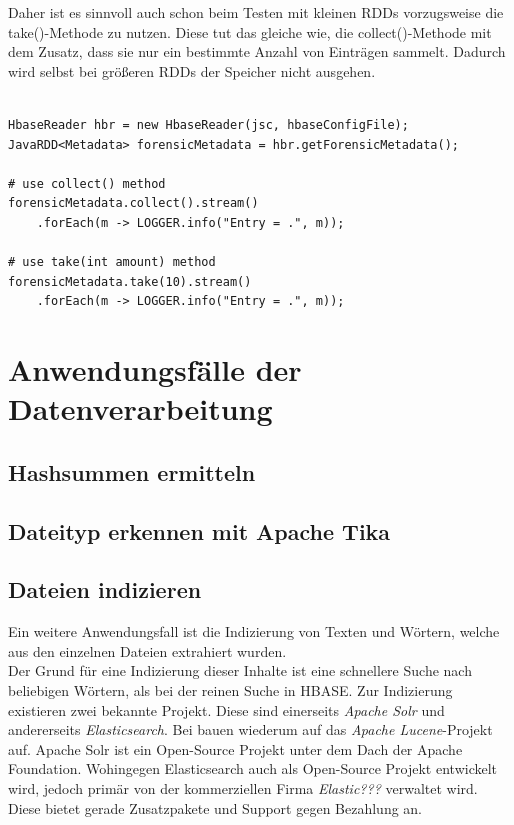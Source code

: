 \noindent
Daher ist es sinnvoll auch schon beim Testen mit kleinen RDDs vorzugsweise die take()-Methode zu nutzen. Diese tut das gleiche wie, die collect()-Methode mit dem Zusatz, dass sie nur ein bestimmte Anzahl von Einträgen sammelt. Dadurch wird selbst bei größeren RDDs der Speicher nicht ausgehen. 


\begin{lstlisting}[label={lst:spark_rdd_collect},caption= Spark Java RDD collect()-Methode ,captionpos=b,frame=single,style=customshell]

HbaseReader hbr = new HbaseReader(jsc, hbaseConfigFile);
JavaRDD<Metadata> forensicMetadata = hbr.getForensicMetadata();

# use collect() method
forensicMetadata.collect().stream()
	.forEach(m -> LOGGER.info("Entry = .", m));

# use take(int amount) method	
forensicMetadata.take(10).stream()
	.forEach(m -> LOGGER.info("Entry = .", m));	
\end{lstlisting}


\section{Anwendungsfälle der Datenverarbeitung}
\subsection{Hashsummen ermitteln}

\subsection{Dateityp erkennen mit Apache Tika}

\subsection{Dateien indizieren}
Ein weitere Anwendungsfall ist die Indizierung von Texten und Wörtern, welche aus den einzelnen Dateien extrahiert wurden.\\

\noindent
Der Grund für eine Indizierung dieser Inhalte ist eine schnellere Suche nach beliebigen Wörtern, als bei der reinen Suche in HBASE. Zur Indizierung existieren zwei bekannte Projekt. Diese sind einerseits \textit{Apache Solr} und andererseits \textit{Elasticsearch}. Bei bauen wiederum auf das \textit{Apache Lucene}-Projekt auf. Apache Solr ist ein Open-Source Projekt unter dem Dach der Apache Foundation. Wohingegen Elasticsearch auch als Open-Source Projekt entwickelt wird, jedoch primär von der kommerziellen Firma \textit{Elastic???} verwaltet wird. Diese bietet gerade Zusatzpakete und Support gegen Bezahlung an.
